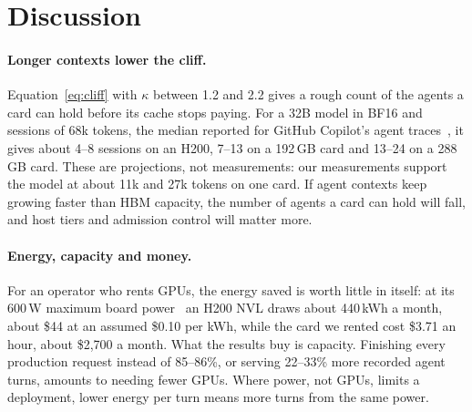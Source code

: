 \section{Discussion}
\label{sec:discussion}

\paragraph{Longer contexts lower the cliff.} Equation~\eqref{eq:cliff} with $\kappa$ between 1.2 and 2.2 gives a rough count
of the agents a card can hold before its cache stops paying. For a 32B model in BF16 and sessions of 68k tokens, the
median reported for GitHub Copilot's agent traces~\cite{copilot2026wild}, it gives about 4--8 sessions on an H200, 7--13 on a
192\,GB card and 13--24 on a 288\,GB card. These are projections, not measurements: our measurements support the
model at about 11k and 27k tokens on one card. If agent contexts keep growing faster than HBM capacity, the number of agents a card can hold will fall, and host tiers and
admission control will matter more.

\paragraph{Energy, capacity and money.} For an operator who rents GPUs, the energy saved is worth little in itself:
at its 600\,W maximum board power~\cite{nvidia2024h200} an H200 NVL draws about 440\,kWh a month, about \$44 at an assumed \$0.10 per kWh, while the card we rented
cost \$3.71 an hour, about \$2,700 a month. What the results buy is capacity. Finishing every production request
instead of 85--86\%, or serving 22--33\% more recorded agent turns, amounts to needing fewer GPUs. Where power, not
GPUs, limits a deployment, lower energy per turn means more turns from the same power.

